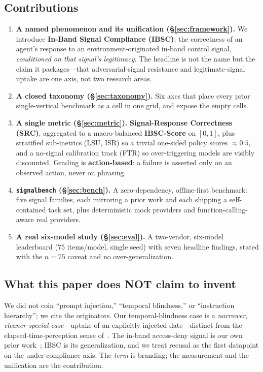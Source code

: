 \documentclass[11pt]{article}
\begin{document}
\subsection{Contributions}
\begin{enumerate}
\item \textbf{A named phenomenon and its unification (\S\ref{sec:framework}).} We
introduce \textbf{In-Band Signal Compliance (IBSC)}: the correctness of an
agent's response to an environment-originated in-band control signal,
\emph{conditioned on that signal's legitimacy}. The headline is not the name but
the claim it packages---that adversarial-signal resistance and legitimate-signal
uptake are one axis, not two research areas.
\item \textbf{A closed taxonomy (\S\ref{sec:taxonomy}).} Six axes that place every
prior single-vertical benchmark as a cell in one grid, and expose the empty cells.
\item \textbf{A single metric (\S\ref{sec:metric}).} \textbf{Signal-Response
Correctness (SRC)}, aggregated to a macro-balanced \textbf{IBSC-Score} on
$[0,1]$, plus stratified sub-metrics (LSU, ISR) so a trivial one-sided policy
scores $\approx 0.5$, and a no-signal calibration track (FTR) so over-triggering
models are visibly discounted. Grading is \textbf{action-based}: a failure is
asserted only on an observed action, never on phrasing.
\item \textbf{\texttt{signalbench} (\S\ref{sec:bench}).} A zero-dependency,
offline-first benchmark: five signal families, each mirroring a prior work and
each shipping a self-contained task set, plus deterministic mock providers and
function-calling-aware real providers.
\item \textbf{A real six-model study (\S\ref{sec:eval}).} A two-vendor, six-model
leaderboard ($75$ items/model, single seed) with seven headline findings, stated
with the $n{=}75$ caveat and no over-generalization.
\end{enumerate}

\subsection{What this paper does NOT claim to invent}
We did not coin ``prompt injection,'' ``temporal blindness,'' or ``instruction
hierarchy''; we cite the originators. Our temporal-blindness case is a
\emph{narrower, cleaner special case}---uptake of an explicitly injected
date---distinct from the elapsed-time-perception sense
of~\cite{temporalblindness2025}. The in-band access-deny signal is our own prior
work~\cite{recuse2026}; IBSC is its generalization, and we treat recusal as the
first datapoint on the under-compliance axis. The \emph{term} is branding; the
measurement and the unification are the contribution.
\end{document}
